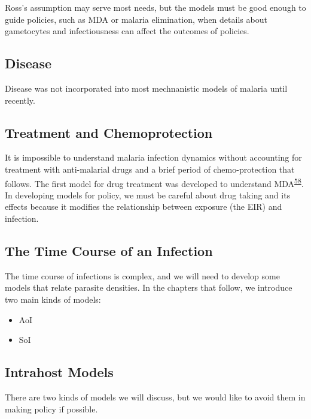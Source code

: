 \documentclass[
]{book}
\begin{document}
Ross's assumption may serve most needs, but the models must be good enough to guide policies, such as MDA or malaria elimination, when details about gametocytes and infectiousness can affect the outcomes of policies.

\hypertarget{disease}{%
\subsection{Disease}\label{disease}}

Disease was not incorporated into most mechnanistic models of malaria until recently.

\hypertarget{treatment-and-chemoprotection}{%
\subsection{Treatment and Chemoprotection}\label{treatment-and-chemoprotection}}

It is impossible to understand malaria infection dynamics without accounting for treatment with anti-malarial drugs and a brief period of chemo-protection that follows. The first model for drug treatment was developed to understand MDA\textsuperscript{\protect\hyperlink{ref-DietzK1975ModelsParasitic}{58}}. In developing models for policy, we must be careful about drug taking and its effects because it modifies the relationship between exposure (the EIR) and infection.

\hypertarget{the-time-course-of-an-infection}{%
\subsection{The Time Course of an Infection}\label{the-time-course-of-an-infection}}

The time course of infections is complex, and we will need to develop some models that relate parasite densities. In the chapters that follow, we introduce two main kinds of models:

\begin{itemize}
\item
  AoI
\item
  SoI
\end{itemize}

\hypertarget{intrahost-models}{%
\subsection{Intrahost Models}\label{intrahost-models}}

There are two kinds of models we will discuss, but we would like to avoid them in making policy if possible.
\end{document}
